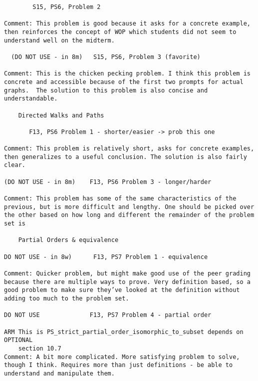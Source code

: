 \documentclass[handout]{mcs}
\begin{document}
\begin{staffnotes}
\begin{verbatim}
        S15, PS6, Problem 2

Comment: This problem is good because it asks for a concrete example,
then reinforces the concept of WOP which students did not seem to
understand well on the midterm.

  (DO NOT USE - in 8m)   S15, PS6, Problem 3 (favorite) 

Comment: This is the chicken pecking problem. I think this problem is
concrete and accessible because of the first two prompts for actual
graphs.  The solution to this problem is also concise and
understandable.

    Directed Walks and Paths

       F13, PS6 Problem 1 - shorter/easier -> prob this one

Comment: This problem is relatively short, asks for concrete examples,
then generalizes to a useful conclusion. The solution is also fairly
clear.

(DO NOT USE - in 8m)    F13, PS6 Problem 3 - longer/harder 

Comment: This problem has some of the same characteristics of the
previous, but is more difficult and lengthy. One should be picked over
the other based on how long and different the remainder of the problem
set is

    Partial Orders & equivalence

DO NOT USE - in 8w)      F13, PS7 Problem 1 - equivalence

Comment: Quicker problem, but might make good use of the peer grading
because there are multiple ways to prove. Very definition based, so a
good problem to make sure they’ve looked at the definition without
adding too much to the problem set.

DO NOT USE              F13, PS7 Problem 4 - partial order

ARM This is PS_strict_partial_order_isomorphic_to_subset depends on OPTIONAL
    section 10.7
Comment: A bit more complicated. More satisfying problem to solve,
though I think. Requires more than just definitions - be able to
understand and manipulate them.
\end{verbatim}
\end{staffnotes}




\end{document}
